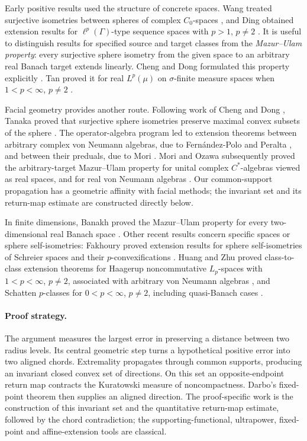 \documentclass[11pt]{article}
\theoremstyle{remark}
\begin{document}
Early positive results used the structure of concrete spaces. Wang
treated surjective isometries between spheres of complex $C_0$-spaces
\cite{Wang1994}, and Ding obtained extension results for
$\ell^p(\Gamma)$-type sequence spaces with $p>1$, $p\ne2$
\cite{Ding2003}.
It is useful to distinguish results for specified source and target classes from the
\emph{Mazur--Ulam property}: every surjective sphere isometry from the
given space to an arbitrary real Banach target extends linearly.
Cheng and Dong formulated this property explicitly
\cite{ChengDong2011}. Tan proved it for real $L^p(\mu)$ on
$\sigma$-finite measure spaces when $1<p<\infty$, $p\ne2$
\cite{Tan2012Lp}.

Facial geometry provides another route. Following work of Cheng and Dong
\cite{ChengDong2011}, Tanaka proved that surjective sphere isometries preserve
maximal convex subsets of the sphere \cite[Lemma~3.5]{Tanaka2014}.
The operator-algebra program led to extension theorems between arbitrary
complex von Neumann algebras, due to Fern\'andez-Polo and Peralta
\cite{FernandezPoloPeralta2018VN}, and between their preduals, due to
Mori \cite{Mori2018}. Mori and Ozawa subsequently proved the arbitrary-target
Mazur--Ulam property for unital complex $C^*$-algebras viewed as real
spaces, and for real von Neumann algebras \cite{MoriOzawa2020}.
Our common-support propagation has a geometric affinity with facial
methods; the invariant set and its return-map estimate are constructed
directly below.

In finite dimensions, Banakh proved the Mazur--Ulam property for every
two-dimensional real Banach space \cite{Banakh2022}.
Other recent results concern specific spaces or sphere self-isometries:
Fakhoury proved extension results for sphere self-isometries of
Schreier spaces and their $p$-convexifications \cite{Fakhoury2025}.
Huang and Zhu proved class-to-class extension theorems for
Haagerup noncommutative $L_p$-spaces with
$1<p<\infty$, $p\ne2$, associated with arbitrary von Neumann algebras
\cite{HuangZhu2026Haagerup}, and Schatten $p$-classes for
$0<p<\infty$, $p\ne2$, including quasi-Banach cases
\cite{HuangZhu2026Schatten}.

\paragraph{Proof strategy.}
The argument measures the largest error in preserving a distance between two radius levels. Its central geometric step turns a hypothetical positive error into two aligned chords. Extremality propagates through common supports, producing an invariant closed convex set of directions. On this set an opposite-endpoint return map contracts the Kuratowski measure of noncompactness. Darbo's fixed-point theorem then supplies an aligned direction. The proof-specific work is the construction of this invariant set and the quantitative return-map estimate, followed by the chord contradiction; the supporting-functional, ultrapower, fixed-point and affine-extension tools are classical.
\end{document}
